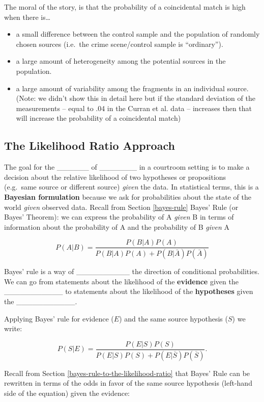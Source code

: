 \documentclass[]{book}
\providecommand{\tightlist}{%
  \setlength{\itemsep}{0pt}\setlength{\parskip}{0pt}}
\theoremstyle{definition}
\theoremstyle{definition}
\theoremstyle{remark}
\begin{document}
The moral of the story, is that the probability of a coincidental match
is high when there is\ldots{}

\begin{itemize}
\tightlist
\item
  a small difference between the control sample and the population of
  randomly chosen sources (i.e.~the crime scene/control sample is
  ``ordinary'').
\item
  a large amount of heterogeneity among the potential sources in the
  population.
\item
  a large amount of variability among the fragments in an individual
  source. (Note: we didn't show this in detail here but if the standard
  deviation of the measurements -- equal to .04 in the Curran et al.
  data -- increases then that will increase the probability of a
  coincidental match)
\end{itemize}

\subsection{The Likelihood Ratio
Approach}\label{the-likelihood-ratio-approach}

The goal for the \_\_\_\_\_\_ of \_\_\_\_\_\_\_ in a courtroom setting
is to make a decision about the relative likelihood of two hypotheses or
propositions (e.g.~same source or different source) \emph{given} the
data. In statistical terms, this is a \textbf{Bayesian formulation}
because we ask for probabilities about the state of the world
\emph{given} observed data. Recall from Section \ref{bayes-rule} Bayes'
Rule (or Bayes' Theorem): we can express the probability of A
\emph{given} B in terms of information about the probability of A and
the probability of B \emph{given} A

\[P(A|B) = \frac{P(B|A)P(A)}{P(B|A)P(A) + P(B|\bar{A})P(\bar{A})}\]

Bayes' rule is a way of \_\_\_\_\_\_\_\_\_\_ the direction of
conditional probabilities. We can go from statements about the
likelihood of the \textbf{evidence} given the \_\_\_\_\_\_\_\_\_\_\_ to
statements about the likelihood of the \textbf{hypotheses} given the
\_\_\_\_\_\_\_\_\_\_\_.

Applying Bayes' rule for evidence (\(E\)) and the same source hypothesis
(\(S\)) we write:

\[P(S|E) = \frac{P(E|S)P(S)}{P(E|S)P(S) + P(E|\overline{S})P(\overline{S})}.\]

Recall from Section \ref{bayes-rule-to-the-likelihood-ratio} that Bayes'
Rule can be rewritten in terms of the odds in favor of the same source
hypothesis (left-hand side of the equation) given the evidence:
\end{document}
